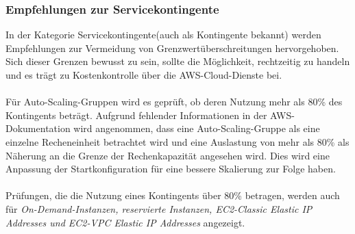 \subsubsection*{Empfehlungen zur Servicekontingente}
In der Kategorie Servicekontingente(auch als Kontingente bekannt) werden Empfehlungen zur Vermeidung von Grenzwertüberschreitungen hervorgehoben. Sich dieser Grenzen bewusst zu sein, sollte die Möglichkeit, rechtzeitig zu handeln und es trägt zu Kostenkontrolle über die AWS-Cloud-Dienste bei.
\\\\
Für Auto-Scaling-Gruppen %
wird es geprüft, ob deren Nutzung mehr als 80\% des Kontingents beträgt. Aufgrund fehlender Informationen in der AWS-Dokumentation wird angenommen, dass eine Auto-Scaling-Gruppe als eine einzelne Recheneinheit betrachtet wird und eine Auslastung von mehr als 80\% als Näherung an die Grenze der Rechenkapazität angesehen wird.
Dies wird eine Anpassung der Startkonfiguration für eine bessere Skalierung zur Folge haben. %
\\\\
Prüfungen, die die Nutzung eines Kontingents über 80\% betragen, werden auch für \textit{On-Demand-Instanzen, reservierte Instanzen, EC2-Classic Elastic IP Addresses und EC2-VPC Elastic IP Addresses} angezeigt.

